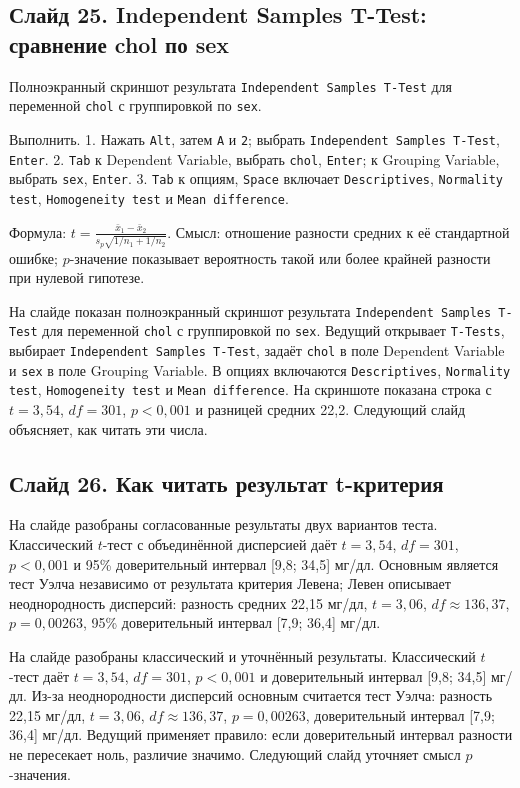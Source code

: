 \documentclass[11pt,a4paper]{article}
\begin{document}
\subsection*{Слайд 25. Independent Samples T-Test: сравнение chol по sex}
\begin{onslide}
Полноэкранный скриншот результата \texttt{Independent Samples T-Test} для переменной \texttt{chol} с группировкой по \texttt{sex}.
\end{onslide}
\begin{jamovi}
Выполнить. 1. Нажать \texttt{Alt}, затем \texttt{A} и \texttt{2}; выбрать \texttt{Independent Samples T-Test}, \texttt{Enter}. 2. \texttt{Tab} к Dependent Variable, выбрать \texttt{chol}, \texttt{Enter}; к Grouping Variable, выбрать \texttt{sex}, \texttt{Enter}. 3. \texttt{Tab} к опциям, \texttt{Space} включает \texttt{Descriptives}, \texttt{Normality test}, \texttt{Homogeneity test} и \texttt{Mean difference}.
\par Формула: $t=\frac{\bar{x}_1-\bar{x}_2}{s_p\sqrt{1/n_1+1/n_2}}$. Смысл: отношение разности средних к её стандартной ошибке; $p$-значение показывает вероятность такой или более крайней разности при нулевой гипотезе.
\end{jamovi}
На слайде показан полноэкранный скриншот результата \texttt{Independent Samples T-Test} для переменной \texttt{chol} с группировкой по \texttt{sex}. Ведущий открывает \texttt{T-Tests}, выбирает \texttt{Independent Samples T-Test}, задаёт \texttt{chol} в поле Dependent Variable и \texttt{sex} в поле Grouping Variable. В опциях включаются \texttt{Descriptives}, \texttt{Normality test}, \texttt{Homogeneity test} и \texttt{Mean difference}. На скриншоте показана строка с $t = 3{,}54$, $df = 301$, $p < 0{,}001$ и разницей средних 22,2. Следующий слайд объясняет, как читать эти числа.

\subsection*{Слайд 26. Как читать результат t-критерия}
\begin{onslide}
На слайде разобраны согласованные результаты двух вариантов теста. Классический $t$-тест с объединённой дисперсией даёт $t = 3{,}54$, $df = 301$, $p < 0{,}001$ и 95\% доверительный интервал [9,8; 34,5] мг/дл. Основным является тест Уэлча независимо от результата критерия Левена; Левен описывает неоднородность дисперсий: разность средних 22,15 мг/дл, $t = 3{,}06$, $df \approx 136{,}37$, $p = 0{,}00263$, 95\% доверительный интервал [7,9; 36,4] мг/дл.
\end{onslide}
На слайде разобраны классический и уточнённый результаты. Классический $t$-тест даёт $t = 3{,}54$, $df = 301$, $p < 0{,}001$ и доверительный интервал [9,8; 34,5] мг/дл. Из-за неоднородности дисперсий основным считается тест Уэлча: разность 22,15 мг/дл, $t = 3{,}06$, $df \approx 136{,}37$, $p = 0{,}00263$, доверительный интервал [7,9; 36,4] мг/дл. Ведущий применяет правило: если доверительный интервал разности не пересекает ноль, различие значимо. Следующий слайд уточняет смысл $p$-значения.
\end{document}
